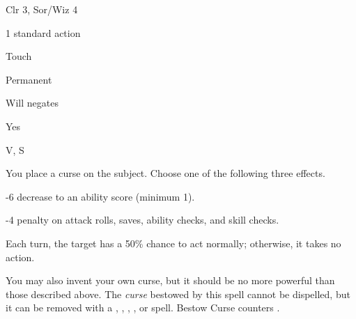 
\begin{description*}
\item[Level:] Clr 3, Sor/Wiz 4
\item[Casting Time:] 1 standard action
\item[Range:] Touch
\item[Duration:] Permanent
\item[Saving Throw:] Will negates
\item[Spell Resistance:] Yes
\item[Components:] V, S
\end{description*}

You place a curse on the subject. Choose one of the following three effects.
\begin{itemize*}
\item -6 decrease to an ability score (minimum 1).
\item -4 penalty on attack rolls, saves, ability checks, and skill checks.
\item Each turn, the target has a 50\% chance to act normally; otherwise, it takes no action.
\end{itemize*}
You may also invent your own curse, but it should be no more powerful than those
described above.
The \textit{curse} bestowed by this spell cannot be dispelled, but it can be removed
with a , , , , or  spell.
Bestow Curse counters .